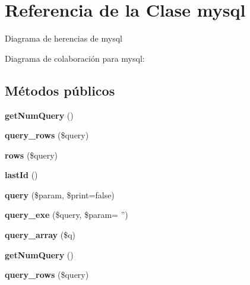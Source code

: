 \hypertarget{classmysql}{\section{Referencia de la Clase mysql}
\label{classmysql}
}


Diagrama de herencias de mysql


Diagrama de colaboración para mysql\-:
\subsection*{Métodos públicos}
\begin{DoxyCompactItemize}
\item 
\hypertarget{classmysql_ad5420dbc0c9f855b6965dd0c08f213dc}{{\bfseries get\-Num\-Query} ()}\label{classmysql_ad5420dbc0c9f855b6965dd0c08f213dc}

\item 
\hypertarget{classmysql_a1c50ed902c43f3060cefae287fe9bc42}{{\bfseries query\-\_\-rows} (\$query)}\label{classmysql_a1c50ed902c43f3060cefae287fe9bc42}

\item 
\hypertarget{classmysql_ae94c38578a427fe7ded34c092005265f}{{\bfseries rows} (\$query)}\label{classmysql_ae94c38578a427fe7ded34c092005265f}

\item 
\hypertarget{classmysql_a27993b901efcccbdbb2738ffdec18f16}{{\bfseries last\-Id} ()}\label{classmysql_a27993b901efcccbdbb2738ffdec18f16}

\item 
\hypertarget{classmysql_a894b10e0655909f999d9f08e293a789a}{{\bfseries query} (\$param, \$print=false)}\label{classmysql_a894b10e0655909f999d9f08e293a789a}

\item 
\hypertarget{classmysql_a3f03bc98b3a3ca0dc3a946f626ba04bc}{{\bfseries query\-\_\-exe} (\$query, \$param= '')}\label{classmysql_a3f03bc98b3a3ca0dc3a946f626ba04bc}

\item 
\hypertarget{classmysql_af3238cdb7634f797cd87dcc85301ae1a}{{\bfseries query\-\_\-array} (\$q)}\label{classmysql_af3238cdb7634f797cd87dcc85301ae1a}

\item 
\hypertarget{classmysql_ad5420dbc0c9f855b6965dd0c08f213dc}{{\bfseries get\-Num\-Query} ()}\label{classmysql_ad5420dbc0c9f855b6965dd0c08f213dc}

\item 
\hypertarget{classmysql_a1c50ed902c43f3060cefae287fe9bc42}{{\bfseries query\-\_\-rows} (\$query)}\label{classmysql_a1c50ed902c43f3060cefae287fe9bc42}


\end{DoxyCompactItemize}
